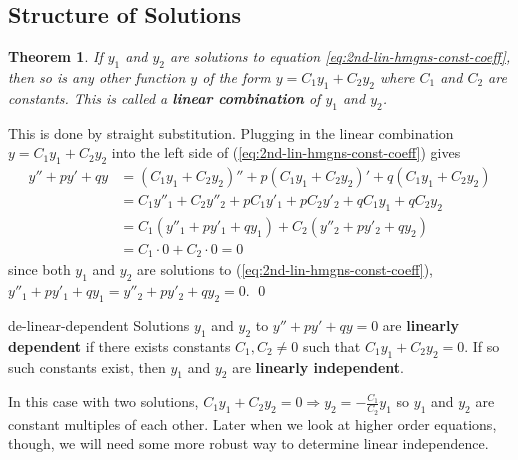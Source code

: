 \documentclass[letterpaper, 11pt, openany]{book}
\theoremstyle{mytheoremstyle}
\newtheorem{theorem}{Theorem}[section]
\renewenvironment{proof}{{\par \sffamily \smaller \fontseries{b}\selectfont Proof}}{\hfill\qed}
\theoremstyle{myexamplestyle}
\begin{document}
\subsection{Structure of Solutions}

\begin{theorem}\label{t:de-2o-lin-combo-solns}
    If \(y_{1}\) and \(y_{2}\) are solutions to equation \eqref{eq:2nd-lin-hmgns-const-coeff}, then so is any other function \(y\) of the form \(y = C_{1} y_{1} + C_{2} y_{2}\) where \(C_{1}\) and \(C_{2}\) are constants. This is called a \textbf{linear combination} of \(y_{1}\) and \(y_{2}\).
\end{theorem}

\begin{proof}
    This is done by straight substitution. Plugging in the linear combination \(y = C_{1} y_{1} + C_{2} y_{2}\) into the left side of (\eqref{eq:2nd-lin-hmgns-const-coeff}) gives
    \begin{align*}
        y'' + py' + qy  &=(C_{1} y_{1} + C_{2} y_{2})'' + p(C_{1} y_{1} + C_{2} y_{2})' + q(C_{1} y_{1} + C_{2} y_{2})\\
        &=  C_{1} y''_{1} +  C_{2} y''_{2} + p C_{1} y'_{1} + p C_{2} y'_{2} + q C_{1} y_{1} + q C_{2} y_{2}\\
        &= C_{1} (y''_{1} + p y'_{1} + qy_{1}) + C_{2} (y''_{2} + p y'_{2} + qy_{2})\\
        &= C_{1} \cdot 0 + C_{2} \cdot 0 = 0
    \end{align*}
    since both \(y_{1}\) and \(y_{2}\) are solutions to (\eqref{eq:2nd-lin-hmgns-const-coeff}), \(y''_{1} + p y'_{1} + qy_{1} = y''_{2} + p y'_{2} + qy_{2} = 0\).
\end{proof}

\begin{definition}{}{de-linear-dependent}
    Solutions \(y_{1}\) and \(y_{2}\) to \(y'' + py' + qy = 0\) are \textbf{linearly dependent} if there exists constants \(C_{1}, C_{2} \neq 0\) such that \(C_{1} y_{1} + C_{2} y_{2} = 0\). If so such constants exist, then \(y_{1}\) and \(y_{2}\) are \textbf{linearly independent}.
\end{definition}

In this case with two solutions,  \(C_{1} y_{1} + C_{2} y_{2} = 0 \Rightarrow y_{2} = -\frac{C_{1}}{C_{2}} y_{1}\) so \(y_{1}\) and \(y_{2}\) are constant multiples of each other. Later when we look at higher order equations, though, we will need some more robust way to determine linear independence.
\end{document}
